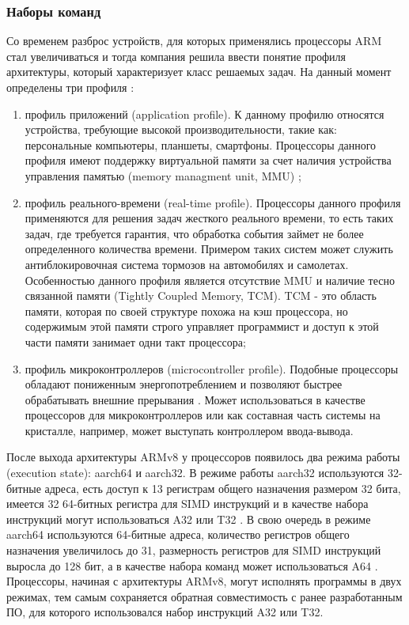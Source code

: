 \subsubsection{Наборы команд}
Со временем разброс устройств, для которых применялись процессоры ARM стал увеличиваться и тогда компания решила ввести 
понятие профиля архитектуры, который характеризует класс решаемых задач. На данный момент определены три профиля \cite{ARM_REF}:

\begin{enumerate}
\item профиль приложений (application profile). К данному профилю относятся устройства, требующие высокой производительности,
такие как: персональные компьютеры, планшеты, смартфоны. Процессоры данного профиля имеют поддержку виртуальной памяти за
счет наличия устройства управления памятью (memory managment unit, MMU) \cite{ARM_REF};
\item профиль реального-времени (real-time profile). Процессоры данного профиля применяются для решения задач жесткого 
реального времени, то есть таких задач, где требуется гарантия, что обработка события займет не более определенного 
количества времени. Примером таких систем может служить антиблокировочная система тормозов на автомобилях и самолетах. 
Особенностью данного профиля является отсутствие MMU и наличие тесно связанной памяти (Tightly Coupled Memory, TCM). 
TCM - это область памяти, которая по своей структуре похожа на кэш процессора, но содержимым этой памяти строго управляет 
программист и доступ к этой части памяти занимает одни такт процессора;
\item профиль микроконтроллеров (microcontroller profile). Подобные процессоры обладают пониженным энергопотреблением и
позволяют быстрее обрабатывать внешние прерывания \cite{ARM_REF}. Может использоваться в качестве процессоров для 
микроконтроллеров или как составная часть системы на кристалле, например, может выступать контроллером ввода-вывода.
\end{enumerate}

После выхода архитектуры ARMv8 у процессоров появилось два режима работы (execution state): aarch64 и aarch32.
В режиме работы aarch32 используются 32-битные адреса, есть доступ к 13 регистрам общего назначения размером 32 бита, 
имеется 32 64-битных регистра для SIMD инструкций и в качестве набора инструкций могут использоваться A32 или T32 \cite{ARM_REF}.
В свою очередь в режиме aarch64 используются 64-битные адреса, количество регистров общего назначения увеличилось до 31, 
размерность регистров для SIMD инструкций выросла до 128 бит, а в качестве набора команд может использоваться A64 \cite{ARM_REF}.
Процессоры, начиная с архитектуры ARMv8, могут исполнять программы в двух режимах, тем самым сохраняется обратная совместимость
с ранее разработанным ПО, для которого использовался набор инструкций A32 или T32.

